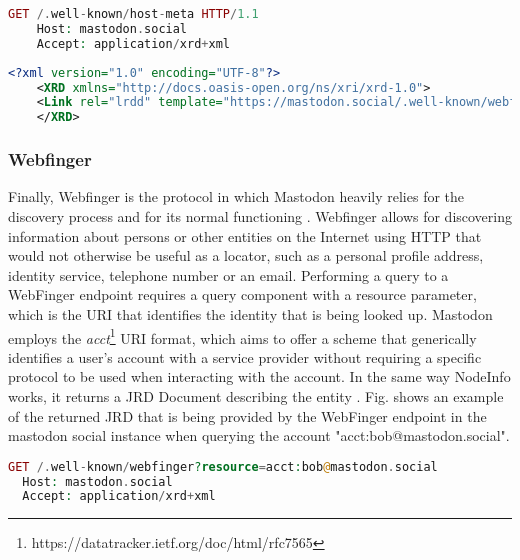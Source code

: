 \lstset{style=JSONStyle}
\begin{lstlisting}[language=PHP, caption=Host Medata request, label="Host Metadata request]
    GET /.well-known/host-meta HTTP/1.1
    Host: mastodon.social
    Accept: application/xrd+xml
\end{lstlisting}

\lstset{style=JSONStyle}
\begin{lstlisting}[language=XML, caption=Host metadata response from mastodon.social, label=host_metadata_response]
    <?xml version="1.0" encoding="UTF-8"?>
    <XRD xmlns="http://docs.oasis-open.org/ns/xri/xrd-1.0">
    <Link rel="lrdd" template="https://mastodon.social/.well-known/webfinger?resource={uri}"/>
    </XRD>
\end{lstlisting}

\subsubsection{Webfinger}
Finally, Webfinger is the protocol in which Mastodon heavily relies for the discovery process and for its normal functioning \cite{rochko_2020}. Webfinger allows for discovering information about persons or other entities on the Internet using HTTP that would not otherwise be useful as a locator, such as a personal profile address, identity service, telephone number or an email. Performing a query to a WebFinger endpoint requires a query component with a resource parameter, which is the URI that identifies the identity that is being looked up. Mastodon employs the \emph{acct}\footnote{https://datatracker.ietf.org/doc/html/rfc7565} URI format, which aims to offer a scheme that generically identifies a user's account with a service provider without requiring a specific protocol to be used when interacting with the account. In the same way NodeInfo works, it returns a JRD Document describing the entity \cite{jones_salgueiro_jones_smarr_2013}.  Fig. \label{Webfinger response from mastodon.social} shows an example of the returned JRD that is being provided by the WebFinger endpoint in the mastodon social instance when querying the account "acct:bob@mastodon.social".

\lstset{style=JSONStyle}
\begin{lstlisting}[language=PHP, caption=HTTP request to Webfinger endpoint, label=Webfinger request]
  GET /.well-known/webfinger?resource=acct:bob@mastodon.social
  Host: mastodon.social
  Accept: application/xrd+xml
\end{lstlisting}

